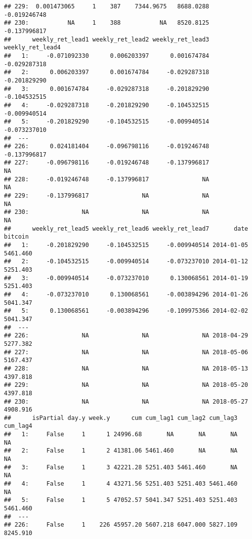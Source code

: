 \documentclass[
]{article}
\begin{document}
\begin{verbatim}
## 229:  0.001473065     1    387    7344.9675   8688.0288 -0.019246748
## 230:           NA     1    388           NA   8520.8125 -0.137996817
##      weekly_ret_lead1 weekly_ret_lead2 weekly_ret_lead3 weekly_ret_lead4
##   1:     -0.071092330      0.006203397      0.001674784     -0.029287318
##   2:      0.006203397      0.001674784     -0.029287318     -0.201829290
##   3:      0.001674784     -0.029287318     -0.201829290     -0.104532515
##   4:     -0.029287318     -0.201829290     -0.104532515     -0.009940514
##   5:     -0.201829290     -0.104532515     -0.009940514     -0.073237010
##  ---                                                                    
## 226:      0.024181404     -0.096798116     -0.019246748     -0.137996817
## 227:     -0.096798116     -0.019246748     -0.137996817               NA
## 228:     -0.019246748     -0.137996817               NA               NA
## 229:     -0.137996817               NA               NA               NA
## 230:               NA               NA               NA               NA
##      weekly_ret_lead5 weekly_ret_lead6 weekly_ret_lead7       date  bitcoin
##   1:     -0.201829290     -0.104532515     -0.009940514 2014-01-05 5461.460
##   2:     -0.104532515     -0.009940514     -0.073237010 2014-01-12 5251.403
##   3:     -0.009940514     -0.073237010      0.130068561 2014-01-19 5251.403
##   4:     -0.073237010      0.130068561     -0.003894296 2014-01-26 5041.347
##   5:      0.130068561     -0.003894296     -0.109975366 2014-02-02 5041.347
##  ---                                                                       
## 226:               NA               NA               NA 2018-04-29 5277.382
## 227:               NA               NA               NA 2018-05-06 5167.437
## 228:               NA               NA               NA 2018-05-13 4397.818
## 229:               NA               NA               NA 2018-05-20 4397.818
## 230:               NA               NA               NA 2018-05-27 4908.916
##      isPartial day.y week.y      cum cum_lag1 cum_lag2 cum_lag3 cum_lag4
##   1:     False     1      1 24996.68       NA       NA       NA       NA
##   2:     False     1      2 41381.06 5461.460       NA       NA       NA
##   3:     False     1      3 42221.28 5251.403 5461.460       NA       NA
##   4:     False     1      4 43271.56 5251.403 5251.403 5461.460       NA
##   5:     False     1      5 47052.57 5041.347 5251.403 5251.403 5461.460
##  ---                                                                    
## 226:     False     1    226 45957.20 5607.218 6047.000 5827.109 8245.910

\end{verbatim}
\end{document}
